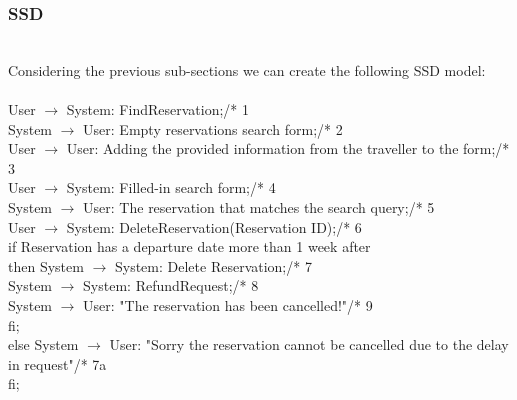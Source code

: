 \subsubsection{SSD}
\creator{\studentC}\\
Considering the previous sub-sections we can create the following SSD model:\\\\
User $\rightarrow$ System: FindReservation;\hfill /* 1\\
System $\rightarrow$ User: Empty reservations search form;\hfill /* 2\\
User $\rightarrow$ User: Adding the provided information from the traveller to the form;\hfill /* 3\\
User $\rightarrow$ System: Filled-in search form;\hfill /* 4\\
System $\rightarrow$ User: The reservation that matches the search query;\hfill /* 5\\
User $\rightarrow$ System: DeleteReservation(Reservation ID);\hfill /* 6\\
if Reservation has a departure date more than 1 week after\\
then System $\rightarrow$ System: Delete Reservation;\hfill /* 7\\
\phantom{x}\hspace{4ex}System $\rightarrow$ System: RefundRequest;\hfill /* 8\\
\phantom{x}\hspace{4ex}System $\rightarrow$ User: "The reservation has been cancelled!"\hfill /* 9\\
\phantom{x}\hspace{4ex}fi;\\
else System $\rightarrow$ User: "Sorry the reservation cannot be cancelled due to the delay in request"\hfill /* 7a\\
fi;\\




